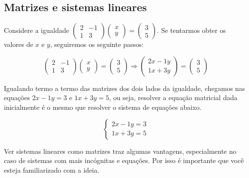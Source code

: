 \documentclass[main.tex]{subfiles}
\begin{document}
\subsection*{Matrizes e sistemas lineares}

Considere a igualdade $\begin{pmatrix}2 & -1 \\ 1 & 3\end{pmatrix} \begin{pmatrix}x \\ y\end{pmatrix} = \begin{pmatrix}3 \\ 5\end{pmatrix}$. Se tentarmos obter os valores de $x$ e $y$, seguiremos os seguinte passos:

$$
\begin{pmatrix}2 & -1 \\ 1 & 3\end{pmatrix} \begin{pmatrix}x \\ y\end{pmatrix} = \begin{pmatrix}3 \\ 5\end{pmatrix} \Rightarrow \begin{pmatrix}2x-1y \\ 1x+3y\end{pmatrix} = \begin{pmatrix}3 \\ 5\end{pmatrix}
$$

Igualando termo a termo das matrizes dos dois lados da igualdade, chegamos nas equações $2x-1y=3$ e $1x+3y=5$, ou seja, resolver a equação matricial dada inicialmente é o mesmo que resolver o sistema de equações abaixo.

$$\begin{cases}2x-1y=3\\1x+3y=5\end{cases}$$

Ver sistemas lineares como matrizes traz algumas vantagens, especialmente no caso de sistemas com mais incógnitas e equações. Por isso é importante que você esteja familiarizado com a ideia.
\end{document}
